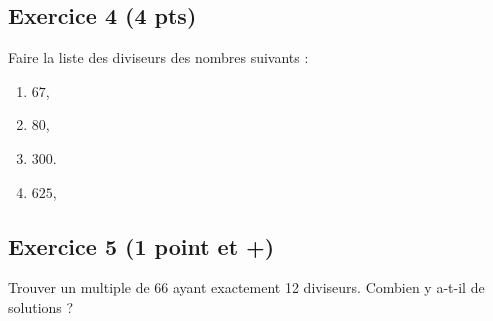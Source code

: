 \documentclass[14 pt]{extarticle}
\theoremstyle{plain}
\begin{document}
\subsection*{Exercice 4 (4 pts)}
Faire la liste des diviseurs des nombres suivants : 
\begin{enumerate}
\item $67$,
\item $80$,
\item $300$.
\item $625$,
\end{enumerate}

\subsection*{Exercice 5 (1 point et +)}

Trouver un multiple de 66 ayant exactement 12 diviseurs. Combien y a-t-il de solutions ?


 	
\end{document}
